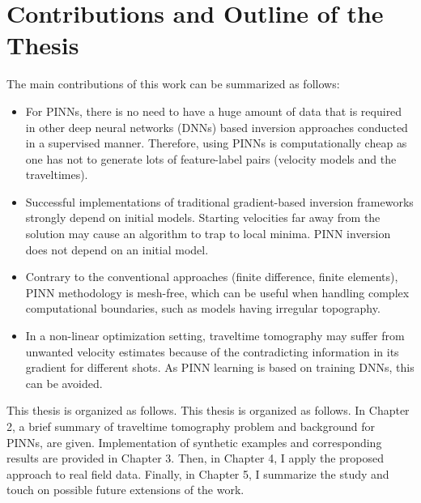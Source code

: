 \section{Contributions and Outline of the Thesis}
\label{sec:contribution}

The main contributions of this work can be summarized as follows:

\begin{itemize}
  \item For PINNs, there is no need to have a huge amount of data that is required in other deep neural networks (DNNs) based inversion approaches conducted in a supervised manner. Therefore, using PINNs is computationally cheap as one has not to generate lots of feature-label pairs (velocity models and the traveltimes).
  \item Successful implementations of traditional gradient-based inversion frameworks strongly depend on initial models. Starting velocities far away from the solution may cause an algorithm to trap to local minima. PINN inversion does not depend on an initial model.
  \item Contrary to the conventional approaches (finite difference, finite elements), PINN methodology is mesh-free, which can be useful when handling complex computational boundaries, such as models having irregular topography.
  \item In a non-linear optimization setting, traveltime tomography may suffer from unwanted velocity estimates because of the contradicting information in its gradient for different shots. As PINN learning is based on training DNNs, this can be avoided.
\end{itemize}

This thesis is organized as follows. This thesis is organized as follows. In Chapter 2, a brief summary of traveltime tomography problem and background for PINNs, are given. Implementation of synthetic examples and corresponding results are provided in Chapter 3. Then, in Chapter 4, I apply the proposed approach to real field data. Finally, in Chapter 5, I summarize the study and touch on possible future extensions of the work.